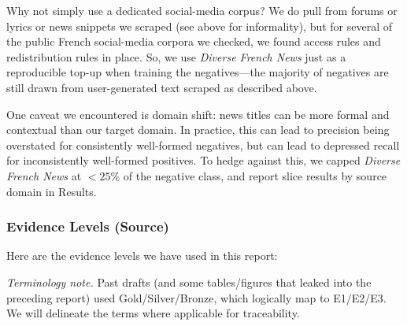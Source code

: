 \documentclass[12pt]{article}
\begin{document}
Why not simply use a dedicated social-media corpus? We do pull from forums or lyrics or news snippets we scraped (see above for informality), but for several of the public French social-media corpora we checked, we found access rules and redistribution rules in place. So, we use \textit{Diverse French News} just as a reproducible top-up when training the negatives\;---\;the majority of negatives are still drawn from user-generated text scraped as described above.

One caveat we encountered is domain shift: news titles can be more formal and contextual than our target domain. In practice, this can lead to precision being overstated for consistently well-formed negatives, but can lead to depressed recall for inconsistently well-formed positives. To hedge against this, we capped \textit{Diverse French News} at \(<25\%\) of the negative class, and report slice results by source domain in Results.

\subsubsection{Evidence Levels (Source)}

Here are the evidence levels we have used in this report:

\begin{table}[H]
\centering
\caption{Evidence levels applied across the verlan dataset.}
\label{tab:verlan_tiers}
\end{table}

\noindent \textit{Terminology note.} Past drafts (and some tables/figures that leaked into the preceding report) used Gold/Silver/Bronze, which logically map to E1/E2/E3. We will delineate the terms where applicable for traceability.
\end{document}
